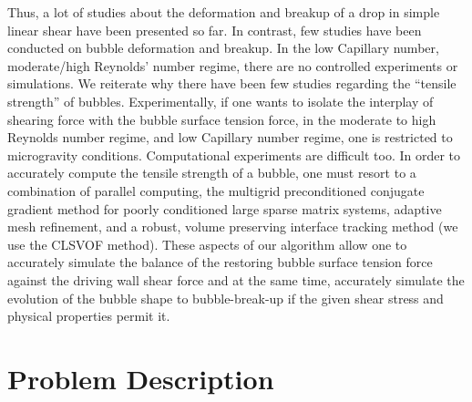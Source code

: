 \documentclass{elsarticle}
\begin{document}
{ Thus, a lot of studies about the deformation and breakup of a drop in simple linear shear have been presented so far. In contrast, few studies have been conducted on bubble deformation and breakup.  In the low Capillary number, moderate/high Reynolds' number regime, there are no controlled experiments or simulations.  We reiterate why there have been few studies regarding the ``tensile strength'' of bubbles. Experimentally, if one wants to isolate the interplay of shearing force with the bubble surface tension force, in the moderate to high Reynolds number regime, and low Capillary number regime, one is restricted to microgravity conditions.  Computational experiments are difficult too. In order to accurately compute the tensile strength of a bubble, one must resort to a combination of parallel computing, the multigrid preconditioned conjugate gradient method\cite{tatebe1993multigrid,SusSmiHusOhtZhi07} for poorly conditioned large sparse matrix systems, adaptive mesh refinement\cite{AMReX_JOSS,SusSmiHusOhtZhi07}, and a robust, volume preserving interface tracking method (we use the CLSVOF method\cite{SusPuc00,SusSmiHusOhtZhi07}).  These aspects of our algorithm allow one to accurately simulate the balance of the restoring bubble surface tension force against the driving wall shear force and at the same time, accurately simulate the evolution of the bubble shape to bubble-break-up if the given shear stress and physical properties permit it.
}
\section{Problem Description}
\end{document}

